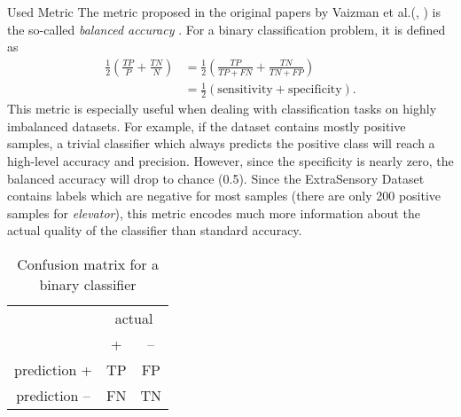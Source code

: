 \begin{subsection}{Used Metric}
		The metric proposed in the original papers by Vaizman et al.(\cite{Vaizman17}, \cite{Vaizman18}) is the so-called \emph{balanced accuracy} \cite{brodersen2010balanced}. For a binary classification problem, it is defined as
		\begin{equation}
			\begin{split}
				\frac{1}{2} \left(\frac{TP}{P} + \frac{TN}{N}\right) & = \frac{1}{2} \left(\frac{TP}{TP + FN} + \frac{TN}{TN + FP}\right)\\
				& = \frac{1}{2} \left(\text{sensitivity} + \text{specificity}\right).
			\end{split}
		\end{equation}
		This metric is especially useful when dealing with classification tasks on highly imbalanced datasets. For example, if the dataset contains mostly positive samples, a trivial classifier which always predicts the positive class will reach a high-level accuracy and precision. However, since the specificity is nearly zero, the balanced accuracy will drop to chance (0.5). Since the ExtraSensory Dataset contains labels which are negative for most samples (there are only 200 positive samples for \emph{elevator}), this metric encodes much more information about the actual quality of the classifier than standard accuracy.
		\begin{table}[H]
			\begin{center} 
				\begin{tabular}{c|c|c|}
					& \multicolumn{2}{c|}{actual} \\
					& +& -- \\
					\midrule
					prediction + & TP & FP \\
					\midrule
					prediction -- & FN & TN \\
					\bottomrule
				\end{tabular}
			\end{center}
			\caption{Confusion matrix for a binary classifier}
		\end{table}

\end{subsection}
